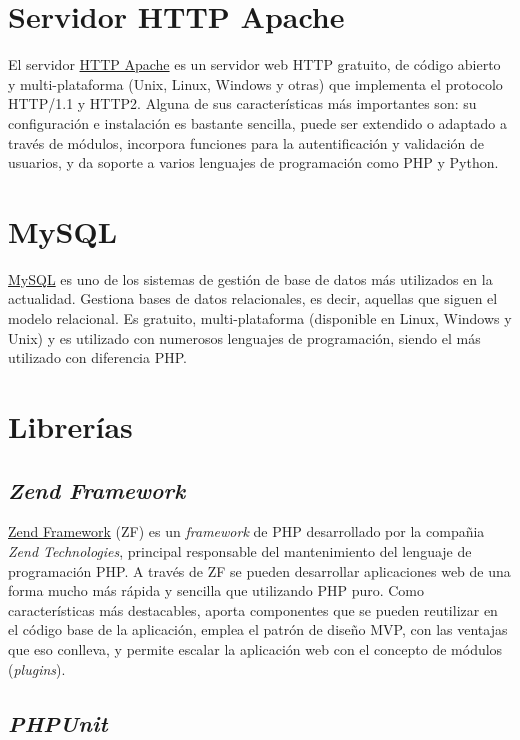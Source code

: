 \section{Servidor HTTP Apache}

El servidor \href{https://httpd.apache.org/}{HTTP Apache} es un servidor
web HTTP gratuito, de código abierto y multi-plataforma (Unix, Linux,
Windows y otras) que implementa el protocolo HTTP/1.1 y HTTP2. Alguna de
sus características más importantes son: su configuración e instalación
es bastante sencilla, puede ser extendido o adaptado a través de
módulos, incorpora funciones para la autentificación y validación de
usuarios, y da soporte a varios lenguajes de programación como PHP y
Python.

\section{MySQL}

\href{https://www.mysql.com/}{MySQL} es uno de los sistemas de gestión
de base de datos más utilizados en la actualidad. Gestiona bases de
datos relacionales, es decir, aquellas que siguen el modelo relacional.
Es gratuito, multi-plataforma (disponible en Linux, Windows y Unix) y es
utilizado con numerosos lenguajes de programación, siendo el más
utilizado con diferencia PHP.

\section{Librerías}

\subsection{\emph{Zend Framework}}

\href{https://framework.zend.com/}{Zend Framework} (ZF) es un
\emph{framework} de PHP desarrollado por la compañia \emph{Zend
Technologies}, principal responsable del mantenimiento del lenguaje de
programación PHP. A través de ZF se pueden desarrollar aplicaciones web
de una forma mucho más rápida y sencilla que utilizando PHP puro. Como
características más destacables, aporta componentes que se pueden
reutilizar en el código base de la aplicación, emplea el patrón de
diseño MVP, con las ventajas que eso conlleva, y permite escalar la
aplicación web con el concepto de módulos (\emph{plugins}).

\subsection{\emph{PHPUnit}}

